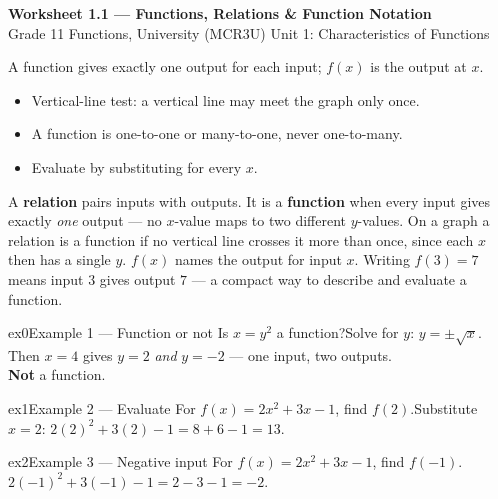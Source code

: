 \documentclass[11pt]{article}
\begin{document}
\begin{center}
{\LARGE\bfseries\color{titleblue}Worksheet 1.1 --- Functions, Relations \& Function Notation}\\[2pt]
{\small Grade 11 Functions, University (MCR3U) \textperiodcentered{} Unit 1: Characteristics of Functions}
\end{center}

\begin{ideabox}
A function gives exactly one output for each input; $f(x)$ is the output at $x$.
\begin{itemize}[leftmargin=*,itemsep=2pt]
  \item Vertical-line test: a vertical line may meet the graph only once.
  \item A function is one-to-one or many-to-one, never one-to-many.
  \item Evaluate by substituting for every $x$.
\end{itemize}
\end{ideabox}

\begin{learnbox}
A \textbf{relation} pairs inputs with outputs. It is a \textbf{function} when every input gives exactly \emph{one} output — no $x$-value maps to two different $y$-values.
On a graph a relation is a function if no vertical line crosses it more than once, since each $x$ then has a single $y$.
$f(x)$ names the output for input $x$. Writing $f(3)=7$ means input $3$ gives output $7$ — a compact way to describe and evaluate a function.
\end{learnbox}


\begin{example}{ex0}{Example 1 --- Function or not}
Is $x=y^2$ a function?\soln Solve for $y$: $y=\pm\sqrt{x}$. Then $x=4$ gives $y=2$ \emph{and} $y=-2$ — one input, two outputs. \\ \textbf{Not} a function.
\end{example}

\begin{example}{ex1}{Example 2 --- Evaluate}
For $f(x)=2x^2+3x-1$, find $f(2)$.\soln Substitute $x=2$: $2(2)^2+3(2)-1=8+6-1=13$.
\end{example}

\begin{example}{ex2}{Example 3 --- Negative input}
For $f(x)=2x^2+3x-1$, find $f(-1)$.\soln $2(-1)^2+3(-1)-1=2-3-1=-2$.
\end{example}
\end{document}
